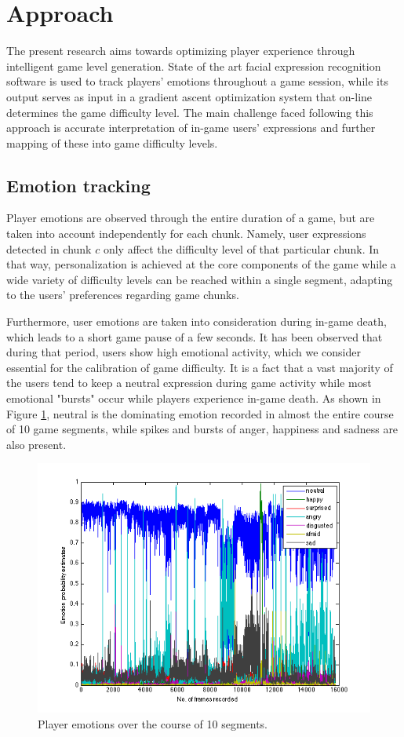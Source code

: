 \documentclass[11pt]{article}
\begin{document}
\section*{Approach}
The present research aims towards optimizing player experience through intelligent game level generation. State of the art facial expression recognition software is used to track players' emotions  throughout a game session, while its output serves as input in a gradient ascent optimization system that on-line determines the game difficulty level. The main challenge faced following this approach is accurate interpretation of in-game users' expressions and further mapping of these into game difficulty levels. 

\subsection*{Emotion tracking}
Player emotions are observed through the entire duration of a game, but are taken into account independently for each chunk. Namely, user expressions detected in chunk $c$ only affect the difficulty level of that particular chunk. In that way, personalization is achieved at the core components of the game while a wide variety of difficulty levels can be reached within a single segment, adapting to the users' preferences regarding game chunks.

Furthermore, user emotions are taken into consideration during in-game death, which leads to a short game pause of a few seconds. It has been observed that during that period, users show high emotional activity, which we consider essential for the calibration of game difficulty.	It is a fact that a vast majority of the users tend to keep a neutral expression during game activity while most emotional "bursts" occur while players experience in-game death. As shown in Figure \ref{fig:emotions10seg}, neutral is the dominating emotion recorded in almost the entire course of 10 game segments, while spikes and bursts of anger, happiness and sadness are also present.

\begin{figure}
\includegraphics[scale=0.6]{emotions.png}
\caption{Player emotions over the course of 10 segments.}
\label{fig:emotions10seg}
\end{figure}
\end{document}
